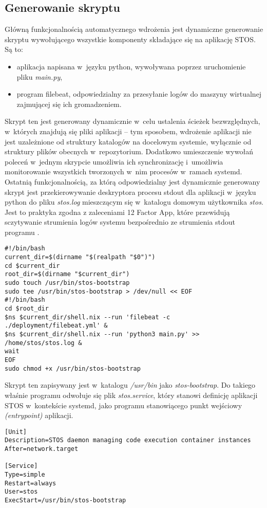 \subsection{Generowanie skryptu}
Główną funkcjonalnością automatycznego wdrożenia jest dynamiczne generowanie skryptu wywołującego wszystkie komponenty składające się na aplikację STOS. Są to:
\begin{itemize}
	\item aplikacja napisana w~języku python, wywoływana poprzez uruchomienie pliku \textit{main.py},
	\item program filebeat, odpowiedzialny za przesyłanie logów do maszyny wirtualnej zajmującej się ich gromadzeniem.
\end{itemize}
Skrypt ten jest generowany dynamicznie w~celu ustalenia ścieżek bezwzględnych, w~których znajdują się pliki aplikacji -- tym sposobem, wdrożenie aplikacji nie jest uzależnione od struktury katalogów na docelowym systemie, wyłącznie od struktury plików obecnych w~repozytorium. Dodatkowo umieszczenie wywołań poleceń w~jednym skrypcie umożliwia ich synchronizację i~umożliwia monitorowanie wszystkich tworzonych w~nim procesów w~ramach systemd. Ostatnią funkcjonalnością, za którą odpowiedzialny jest dynamicznie generowany skrypt jest przekierowywanie deskryptora procesu stdout dla aplikacji w~języku python do pliku \textit{stos.log} mieszczącym się w~katalogu domowym użytkownika \textit{stos}. Jest to praktyka zgodna z zaleceniami 12 Factor App, które przewidują sczytywanie strumienia logów systemu bezpośrednio ze strumienia stdout programu \cite{12fa}.
\lstset{style=shell}
\begin{lstlisting}[caption = {Dynamiczne generowanie skryptu uruchamiającego aplikację STOS, uwzględniającego ścieżki bezwzlędne, w~których znajdują się pliki źródłowe aplikacji}]
#!/bin/bash
current_dir=$(dirname "$(realpath "$0")")
cd $current_dir
root_dir=$(dirname "$current_dir")
sudo touch /usr/bin/stos-bootstrap
sudo tee /usr/bin/stos-bootstrap > /dev/null << EOF
#!/bin/bash
cd $root_dir
$ns $current_dir/shell.nix --run 'filebeat -c ./deployment/filebeat.yml' &
$ns $current_dir/shell.nix --run 'python3 main.py' >> /home/stos/stos.log &
wait
EOF
sudo chmod +x /usr/bin/stos-bootstrap
\end{lstlisting}
Skrypt ten zapisywany jest w~katalogu \textit{/usr/bin} jako \textit{stos-bootstrap}. Do takiego właśnie programu odwołuje się plik \textit{stos.service}, który stanowi definicję aplikacji STOS w~kontekście systemd, jako programu stanowiącego punkt wejściowy \textit{(entrypoint)} aplikacji.
\begin{lstlisting}[caption = {Definicja aplikacji STOS jako serwisu w~kontekście systemd}]
[Unit]
Description=STOS daemon managing code execution container instances
After=network.target

[Service]
Type=simple
Restart=always
User=stos
ExecStart=/usr/bin/stos-bootstrap
\end{lstlisting}
